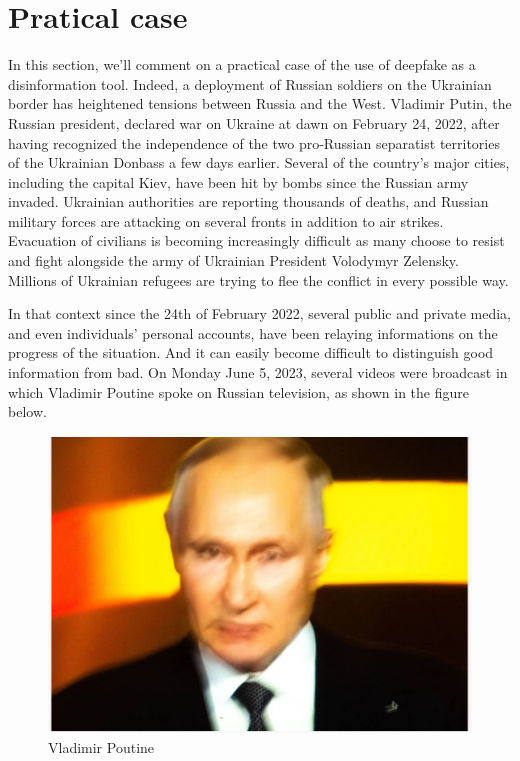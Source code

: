 \section{Pratical case}
In this section, we'll comment on a practical case of the use of deepfake as a disinformation tool.
Indeed, a deployment of Russian soldiers on the Ukrainian border has heightened tensions between Russia and the West. Vladimir Putin, the Russian president, declared war on Ukraine at dawn on February 24, 2022, after having recognized the independence of the two pro-Russian separatist territories of the Ukrainian Donbass a few days earlier. Several of the country's major cities, including the capital Kiev, have been hit by bombs since the Russian army invaded. Ukrainian authorities are reporting thousands of deaths, and Russian military forces are attacking on several fronts in addition to air strikes. Evacuation of civilians is becoming increasingly difficult as many choose to resist and fight alongside the army of Ukrainian President Volodymyr Zelensky. Millions of Ukrainian refugees are trying to flee the conflict in every possible way.

In that context since the 24th of February 2022, several public and private 
media, and even individuals' personal accounts, have been relaying informations on the progress of the situation.  And it can easily become difficult to distinguish good information from bad.  On Monday June 5, 2023, several  videos were broadcast in which Vladimir Poutine  spoke on Russian television, as shown in the figure below.
\
\begin{figure}[h]
    \centering
    \includegraphics[width=0.5\linewidth]{images/poutine.PNG}
    \caption{Vladimir Poutine \cite{coquazDeepfakeFauxMessage}}
    \label{fig:enter-label}
\end{figure}


